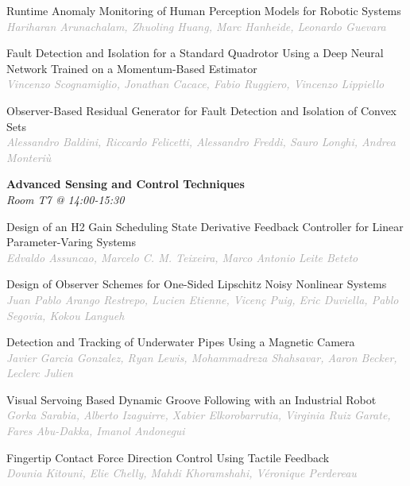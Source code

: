 \begin{multicols*}{2}
\small Runtime Anomaly Monitoring of Human Perception Models for Robotic Systems\\ 
\footnotesize \textcolor{darkgray}{\textit{Hariharan Arunachalam, Zhuoling  Huang, Marc  Hanheide, Leonardo  Guevara}}

\small Fault Detection and Isolation for a Standard Quadrotor Using a Deep Neural Network Trained on a Momentum-Based Estimator\\ 
\footnotesize \textcolor{darkgray}{\textit{Vincenzo Scognamiglio, Jonathan  Cacace, Fabio  Ruggiero, Vincenzo  Lippiello}}

\small Observer-Based Residual Generator for Fault Detection and Isolation of Convex Sets\\ 
\footnotesize \textcolor{darkgray}{\textit{Alessandro Baldini, Riccardo  Felicetti, Alessandro  Freddi, Sauro  Longhi, Andrea  Monteriù}}

\normalsize \textbf{Advanced Sensing and Control Techniques}\\
\small \textit{Room T7 @ 14:00-15:30}

\small Design of an H2 Gain Scheduling State Derivative Feedback Controller for Linear Parameter-Varing Systems\\ 
\footnotesize \textcolor{darkgray}{\textit{Edvaldo Assuncao, Marcelo C. M.  Teixeira, Marco Antonio Leite  Beteto}}

\small Design of Observer Schemes for One-Sided Lipschitz Noisy Nonlinear Systems\\ 
\footnotesize \textcolor{darkgray}{\textit{Juan Pablo Arango Restrepo, Lucien  Etienne, Vicenç  Puig, Eric  Duviella, Pablo  Segovia, Kokou  Langueh}}

\small Detection and Tracking of Underwater Pipes Using a Magnetic Camera\\ 
\footnotesize \textcolor{darkgray}{\textit{Javier Garcia Gonzalez, Ryan  Lewis, Mohammadreza  Shahsavar, Aaron  Becker, Leclerc  Julien}}

\small Visual Servoing Based Dynamic Groove Following with an Industrial Robot\\ 
\footnotesize \textcolor{darkgray}{\textit{Gorka Sarabia, Alberto  Izaguirre, Xabier  Elkorobarrutia, Virginia  Ruiz Garate, Fares  Abu-Dakka, Imanol  Andonegui}}

\small Fingertip Contact Force Direction Control Using Tactile Feedback\\ 
\footnotesize \textcolor{darkgray}{\textit{Dounia Kitouni, Elie  Chelly, Mahdi  Khoramshahi, Véronique  Perdereau}}


\end{multicols*}
